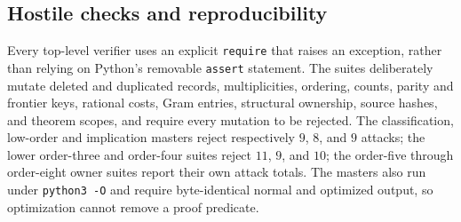 \documentclass[11pt]{article}
\theoremstyle{remark}
\begin{document}
\subsection{Hostile checks and reproducibility}

Every top-level verifier uses an explicit \verb|require| that raises an
exception, rather than relying on Python's removable \verb|assert| statement.
The suites deliberately mutate deleted and duplicated records, multiplicities,
ordering, counts, parity and frontier keys, rational costs, Gram entries,
structural ownership, source hashes, and theorem scopes, and require every
mutation to be rejected.  The classification, low-order and implication
masters reject respectively $9$, $8$, and $9$ attacks; the lower order-three
and order-four suites reject $11$, $9$, and $10$; the order-five through
order-eight owner suites report their own attack totals.  The masters also run
under \verb|python3 -O| and require byte-identical normal and optimized output,
so optimization cannot remove a proof predicate.
\end{document}
